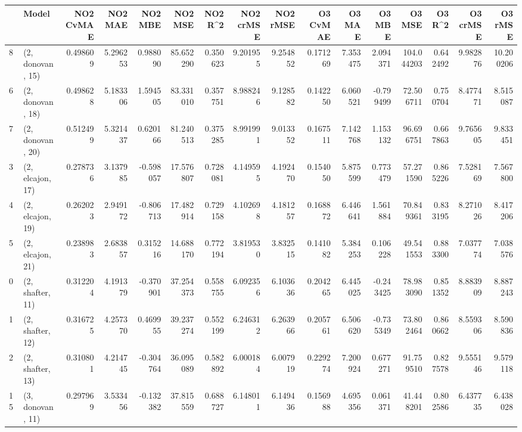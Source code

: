 \begin{tabular}{llrrrrrrrrrrrrrr}
\toprule
{} &             Model &  NO2 CvMAE &   NO2 MAE &   NO2 MBE &    NO2 MSE &   NO2 R\textasciicircum2 &  NO2 crMSE &  NO2 rMSE &  O3 CvMAE &    O3 MAE &    O3 MBE &      O3 MSE &    O3 R\textasciicircum2 &   O3 crMSE &    O3 rMSE \\
\midrule
8  &  (2, donovan, 15) &   0.498609 &  5.296253 &  0.988090 &  85.652290 &  0.350623 &   9.201955 &  9.254852 &  0.171269 &  7.353475 &  2.094371 &  104.044203 &  0.642492 &   9.982876 &  10.200206 \\
6  &  (2, donovan, 18) &   0.498628 &  5.183306 &  1.594505 &  83.331010 &  0.357751 &   8.988246 &  9.128582 &  0.142250 &  6.060521 & -0.799499 &   72.506711 &  0.750704 &   8.477471 &   8.515087 \\
7  &  (2, donovan, 20) &   0.512499 &  5.321437 &  0.620166 &  81.240513 &  0.375285 &   8.991991 &  9.013352 &  0.167511 &  7.142768 &  1.153132 &   96.696751 &  0.667863 &   9.765605 &   9.833451 \\
3  &  (2, elcajon, 17) &   0.278736 &  3.137985 & -0.598057 &  17.576807 &  0.728081 &   4.149595 &  4.192470 &  0.154050 &  5.875599 &  0.773479 &   57.271590 &  0.865226 &   7.528169 &   7.567800 \\
4  &  (2, elcajon, 19) &   0.262023 &  2.949172 & -0.806713 &  17.482914 &  0.729158 &   4.102698 &  4.181257 &  0.168872 &  6.446641 &  1.561884 &   70.849361 &  0.833195 &   8.271026 &   8.417206 \\
5  &  (2, elcajon, 21) &   0.238983 &  2.683857 &  0.315216 &  14.688170 &  0.772194 &   3.819530 &  3.832515 &  0.141082 &  5.384253 &  0.106228 &   49.541553 &  0.883300 &   7.037774 &   7.038576 \\
0  &  (2, shafter, 11) &   0.312204 &  4.191379 & -0.370901 &  37.254373 &  0.558755 &   6.092356 &  6.103636 &  0.204265 &  6.445025 & -0.243425 &   78.983090 &  0.851352 &   8.883909 &   8.887243 \\
1  &  (2, shafter, 12) &   0.316725 &  4.257370 &  0.469955 &  39.237274 &  0.552199 &   6.246312 &  6.263966 &  0.205761 &  6.506620 & -0.735349 &   73.802464 &  0.860662 &   8.559306 &   8.590836 \\
2  &  (2, shafter, 13) &   0.310801 &  4.214745 & -0.304764 &  36.095089 &  0.582892 &   6.000184 &  6.007919 &  0.229274 &  7.200924 &  0.677271 &   91.759510 &  0.827578 &   9.555146 &   9.579118 \\
15 &  (3, donovan, 11) &   0.297969 &  3.533456 & -0.132382 &  37.815559 &  0.688727 &   6.148011 &  6.149436 &  0.156988 &  4.695356 &  0.061371 &   41.448201 &  0.802586 &   6.437735 &   6.438028 \\

\end{tabular}
